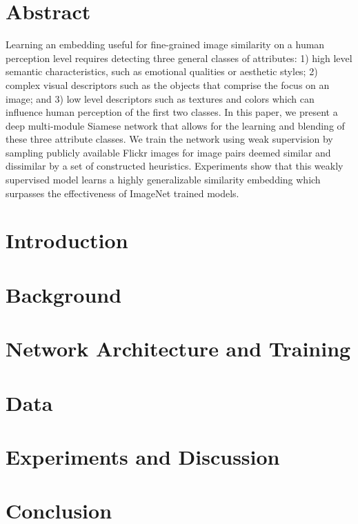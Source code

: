 \documentclass[11pt, notitlepage]{report}
\begin{document}
\chapter*{Abstract} \label{section:abstract}
	Learning an embedding useful for fine-grained image similarity on a human perception level requires detecting three general classes of attributes: 1) high level semantic characteristics, such as emotional qualities or aesthetic styles; 2) complex visual descriptors such as the objects that comprise the focus on an image; and 3) low level descriptors such as textures and colors which can influence human perception of the first two classes. In this paper, we present a deep multi-module Siamese network that allows for the learning and blending of these three attribute classes. We train the network using weak supervision by sampling publicly available Flickr images for image pairs deemed similar and dissimilar by a set of constructed heuristics. Experiments show that this weakly supervised model learns a highly generalizable similarity embedding which surpasses the effectiveness of ImageNet trained models.
	

\chapter{Introduction} \label{chapter:intro}


\chapter{Background} \label{chapter:background}


\chapter{Network Architecture and Training} \label{chapter:network}


\chapter{Data} \label{chapter:data}


\chapter{Experiments and Discussion} \label{chapter:experiments}


\chapter{Conclusion} \label{chapter:conclusion}


\begin{appendices}

\end{appendices}

\setlength{\bibsep}{1pt}
{


}
\end{document}
